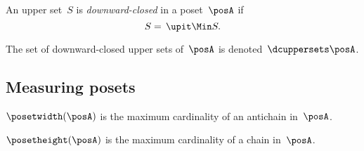 \begin{definition}
  \label{def:downward-closed-upperset}
  An upper set~$S$ is \emph{downward-closed} in a poset~$\posA$ if
  \begin{equation}
    S =\, \upit  \Min S.
  \end{equation}
\end{definition}

The set of downward-closed upper sets of~$\posA$ is denoted~$\dcuppersets \posA$.

\subsection{Measuring posets}
\begin{definition}
  \label{def:poset-width}
  $\posetwidth(\posA)$ is the maximum cardinality of an antichain in~$\posA$.
\end{definition}


\begin{definition}
  \label{def:poset-height} $\posetheight(\posA)$ is the maximum cardinality of a chain in~$\posA$.
\end{definition}

